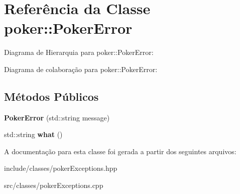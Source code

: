 \hypertarget{classpoker_1_1PokerError}{}\section{Referência da Classe poker\+:\+:Poker\+Error}
\label{classpoker_1_1PokerError}


Diagrama de Hierarquia para poker\+:\+:Poker\+Error\+:


Diagrama de colaboração para poker\+:\+:Poker\+Error\+:
\subsection*{Métodos Públicos}
\begin{DoxyCompactItemize}
\item 
\mbox{\label{classpoker_1_1PokerError_a3f252729d5a53f688c62d8ffcc7d8232}} 
{\bfseries Poker\+Error} (std\+::string message)
\item 
\mbox{\label{classpoker_1_1PokerError_af3a5248d7a57a3024db9d116142e54e6}} 
std\+::string {\bfseries what} ()
\end{DoxyCompactItemize}


A documentação para esta classe foi gerada a partir dos seguintes arquivos\+:\begin{DoxyCompactItemize}
\item 
include/classes/poker\+Exceptions.\+hpp\item 
src/classes/poker\+Exceptions.\+cpp\end{DoxyCompactItemize}
